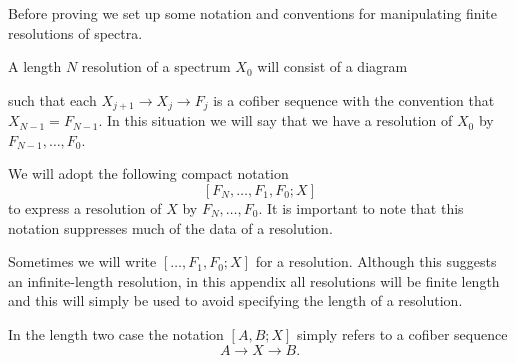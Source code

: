 Before proving  we set up some notation and conventions for manipulating finite resolutions of spectra.

\begin{dfn}
  A length $N$ resolution of a spectrum $X_0$ will consist of a diagram
  \begin{center}
  \end{center}
  such that each $X_{j+1} \to X_j \to F_j$ is a cofiber sequence with the convention that $X_{N-1} = F_{N-1}$.
  In this situation we will say that we have a resolution of $X_0$ by $F_{N-1},\dots,F_0$.
\end{dfn}

\begin{ntn}
  We will adopt the following compact notation
  $$ [F_N, \dots, F_1, F_0; X] $$
  to express a resolution of $X$ by $F_{N},\dots,F_0$.
  It is important to note that this notation suppresses much of the data of a resolution.
\end{ntn}

\begin{wrn}
  Sometimes we will write $[\dots, F_1, F_0;X]$ for a resolution. Although this suggests an infinite-length resolution, in this appendix all resolutions will be finite length and this will simply be used to avoid specifying the length of a resolution. 
\end{wrn}

\begin{rmk}
  In the length two case the notation $[A, B; X]$ simply refers to a cofiber sequence
  $$ A \to X \to B. $$
\end{rmk}

